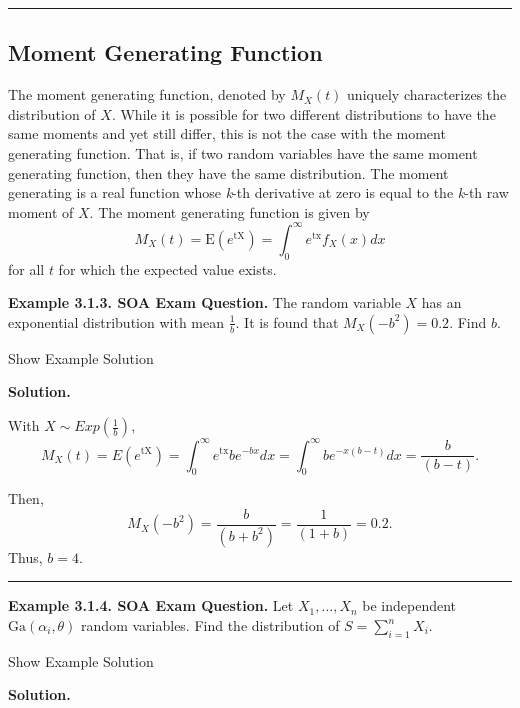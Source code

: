 \documentclass[]{book}
\theoremstyle{definition}
\theoremstyle{definition}
\theoremstyle{definition}
\theoremstyle{remark}
\begin{document}
\begin{center}\rule{0.5\linewidth}{\linethickness}\end{center}

\subsection{Moment Generating
Function}\label{moment-generating-function}

The moment generating function, denoted by \(M_{X}\left( t \right)\)
uniquely characterizes the distribution of \(X\). While it is possible
for two different distributions to have the same moments and yet still
differ, this is not the case with the moment generating function. That
is, if two random variables have the same moment generating function,
then they have the same distribution. The moment generating is a real
function whose \emph{k}-th derivative at zero is equal to the
\emph{k}-th raw moment of \(X\). The moment generating function is given
by
\[M_{X}\left( t \right) = \mathrm{E}\left( e^{\text{tX}} \right) = \int_{0}^{\infty}{e^{\text{tx}}f_{X}\left( x \right) dx }\]
for all \(t\) for which the expected value exists.

\textbf{Example 3.1.3. SOA Exam Question.} The random variable \(X\) has
an exponential distribution with mean \(\frac{1}{b}\). It is found that
\(M_{X}\left( - b^{2} \right) = 0.2\). Find \(b\).

Show Example Solution

\hypertarget{toggleExampleLoss.1.3}{}
\textbf{Solution.}

With \(X \sim Exp \left( \frac{1}{b}\right)\),
\[M_{X}\left( t \right) = E\left( e^{\text{tX}} \right) = \int_{0}^{\infty}{e^{\text{tx}}be^{- bx} dx} = \int_{0}^{\infty}{be^{- x\left( b - t \right)} dx} = \frac{b}{\left( b - t \right)}.\]

Then,
\[M_{X}\left( - b^{2} \right) = \frac{b}{\left( b + b^{2} \right)} = \frac{1}{\left( 1 + b \right)} = 0.2.\]
Thus, \(b = 4\).

\begin{center}\rule{0.5\linewidth}{\linethickness}\end{center}

\textbf{Example 3.1.4. SOA Exam Question.} Let \(X_{1}, \ldots, X_{n}\)
be independent \(\text{Ga}\left( \alpha_{i},\theta \right)\) random
variables. Find the distribution of \(S = \sum_{i = 1}^{n}X_{i}\).

Show Example Solution

\hypertarget{toggleExampleLoss.1.4}{}
\textbf{Solution.}
\end{document}
